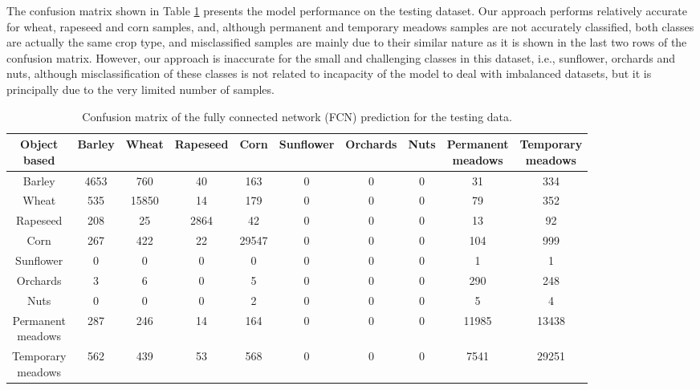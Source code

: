 \documentclass[journal,article,submit,pdftex,moreauthors]{Definitions/mdpi}
\begin{document}
The confusion matrix shown in Table \ref{confusion_matrix} presents the model performance on the testing dataset.
Our approach performs relatively accurate for wheat, rapeseed and corn samples, and, although permanent and temporary meadows samples are not accurately classified, both classes are actually the same crop type, and misclassified samples are mainly due to their similar nature as it is shown in the last two rows of the confusion matrix. However, our approach is inaccurate for the small and challenging classes in this dataset, i.e., sunflower, orchards and nuts, although misclassification of these classes is not related to incapacity of the model to deal with imbalanced datasets, but it is principally due to the very limited number of samples.
\begin{table}[H]
\centering
\scriptsize
\caption{Confusion matrix of the fully connected network (FCN) prediction for the testing data.}
\begin{tabular}{c|ccccccccc}
\hline
\makecell{Object\\based} & Barley & Wheat & Rapeseed & Corn & Sunflower & Orchards & Nuts & \makecell{Permanent\\meadows} & \makecell{Temporary\\meadows} \\ \hline
Barley      & 4653  & 760   & 40   & 163   & 0 & 0 & 0 & 31    & 334   \\
Wheat       & 535  & 15850 & 14   & 179   & 0 & 0 & 0 & 79   & 352   \\
Rapeseed    & 208   & 25    & 2864  & 42    & 0 & 0 & 0 & 13    & 92   \\
Corn        & 267   & 422   & 22  & 29547 & 0 & 0 & 0 & 104   & 999  \\
Sunflower   & 0     & 0 & 0 & 0 & 0 & 0 & 0 & 1 & 1 \\
Orchards    & 3     & 6 & 0 & 5 & 0 & 0 & 0 & 290   & 248   \\
Nuts        & 0     & 0 & 0 & 2 & 0 & 0 & 0 & 5 & 4 \\
\makecell{Permanent\\meadows}   & 287   & 246   & 14    & 164   & 0 & 0 & 0 & 11985 & 13438 \\
\makecell{Temporary\\meadows}   & 562   & 439   & 53    & 568   & 0 & 0 & 0 & 7541  & 29251 \\ 
\hline                  
\end{tabular}
\label{confusion_matrix}
\end{table}
\end{document}
